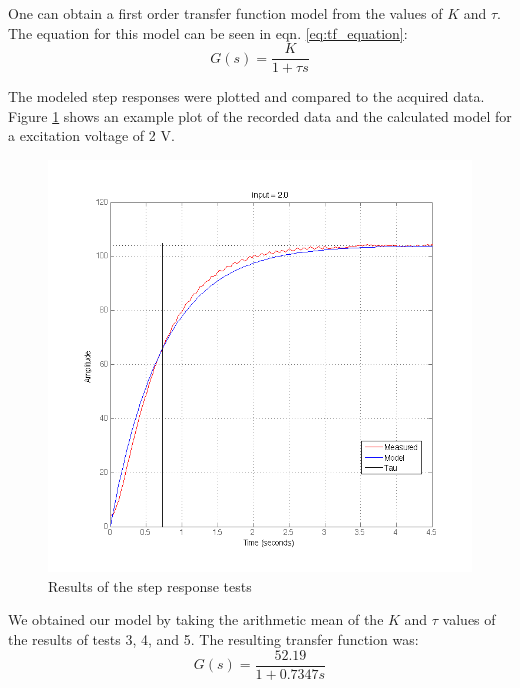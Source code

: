 One can obtain a first order transfer function model from the values of \begin{math}K\end{math} and \begin{math}\tau\end{math}. The equation for this model can be seen in eqn. \eqref{eq:tf_equation}:
\begin{equation}\label{eq:tf_equation}
G(s) = \frac{K}{1+\tau s}
\end{equation}

The modeled step responses were plotted and compared to the acquired data. Figure \ref{fig:model} shows an example plot of the recorded data and the calculated model for a excitation voltage of 2 V.
\begin{figure}[h!]
\begin{center}
\includegraphics[scale=0.4]{./img/model.png}
\end{center}
\caption{Results of the step response tests}
\label{fig:model}
\end{figure}

We obtained our model by taking the arithmetic mean of the \begin{math}K\end{math} and \begin{math}\tau\end{math} values of the results of tests 3, 4, and 5. The resulting transfer function was:
\begin{equation}\label{eq:tf_model}
G(s) = \frac{52.19}{1+0.7347 s}
\end{equation}


